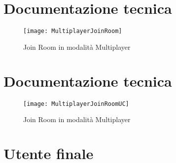 \documentclass[paper=a4, fontsize=11pt]{scrartcl} %
\numberwithin{equation}{section} %
\numberwithin{figure}{section} %
\numberwithin{table}{section} %
\begin{document}
\section{Documentazione tecnica}
\begin{figure}[h]
\centering
\texttt{[image: MultiplayerJoinRoom]}
\caption{Join Room in modalità Multiplayer}
\label{JoinRoom}
\end{figure}

\section{Documentazione tecnica}
\begin{figure}[h]
\centering
\texttt{[image: MultiplayerJoinRoomUC]}
\caption{Join Room in modalità Multiplayer}
\label{JoinRoomUC}
\end{figure}

\section{Utente finale}
\end{document}
